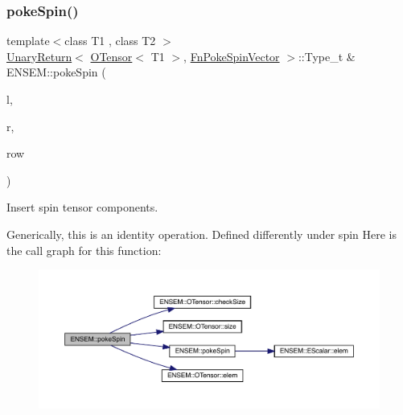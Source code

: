 \subsubsection{\texorpdfstring{pokeSpin()}{pokeSpin()}\hspace{0.1cm}{\footnotesize\ttfamily [1/2]}}
{\footnotesize\ttfamily template$<$class T1 , class T2 $>$ \\
\mbox{\hyperlink{structENSEM_1_1UnaryReturn}{Unary\+Return}}$<$ \mbox{\hyperlink{classENSEM_1_1OTensor}{O\+Tensor}}$<$ T1 $>$, \mbox{\hyperlink{structENSEM_1_1FnPokeSpinVector}{Fn\+Poke\+Spin\+Vector}} $>$\+::Type\+\_\+t \& E\+N\+S\+E\+M\+::poke\+Spin (\begin{DoxyParamCaption}\item[{\mbox{\hyperlink{classENSEM_1_1OTensor}{O\+Tensor}}$<$ T1 $>$ \&}]{l,  }\item[{const \mbox{\hyperlink{classENSEM_1_1OTensor}{O\+Tensor}}$<$ T2 $>$ \&}]{r,  }\item[{int}]{row }\end{DoxyParamCaption})\hspace{0.3cm}{\ttfamily [inline]}}



Insert spin tensor components. 

Generically, this is an identity operation. Defined differently under spin Here is the call graph for this function\+:\nopagebreak
\begin{figure}[H]
\begin{center}
\leavevmode
\includegraphics[width=350pt]{de/d87/group__obstensor_ga8cc48d37eeb15654e69ed5549844c124_cgraph}
\end{center}
\end{figure}
\mbox{\label{group__obstensor_ga2d8623a3d55d368dba3e7b2e1418b6a1}} 
